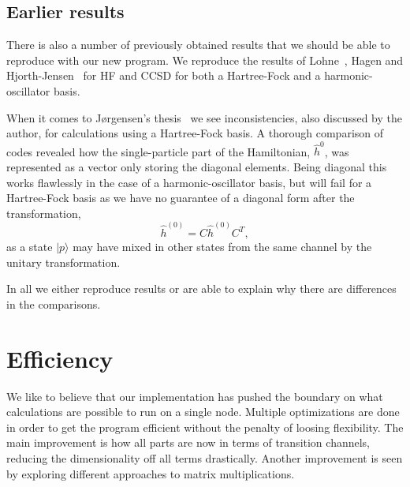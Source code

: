 \subsection{Earlier results}
There is also a number of previously obtained results that we should be able to reproduce with our new program. We reproduce the results of Lohne~\cite{mplohne}, Hagen and Hjorth-Jensen~\cite{PhysRevB.84.115302} for HF and CCSD for both a Hartree-Fock and a harmonic-oscillator basis.

When it comes to Jørgensen's thesis~\cite{marte} we see inconsistencies, also discussed by the author, for calculations using a Hartree-Fock basis.
A thorough comparison of codes revealed how the single-particle part of the Hamiltonian, $\hat{h}^{0}$, was represented as a vector only storing the diagonal elements.
Being diagonal this works flawlessly in the case of a harmonic-oscillator basis, but will fail for a Hartree-Fock basis as we have no guarantee of a diagonal form after the transformation,
\begin{equation}
\hat{h}^{(0)} = C \hat{h}^{(0)} C^T , 
\end{equation}
as a state $|p\rangle$  may have mixed in other states from the same channel by the unitary transformation.

In all we either reproduce results or are able to explain why there are differences in the comparisons.



\section{Efficiency}
We like to believe that our implementation has pushed the boundary on what calculations are possible to run on a single node.
Multiple optimizations are done in order to get the program efficient without the penalty of loosing flexibility.
The main improvement is how all parts are now in terms of transition channels, reducing the dimensionality off all terms drastically.
Another improvement is seen by exploring different approaches to matrix multiplications. 

